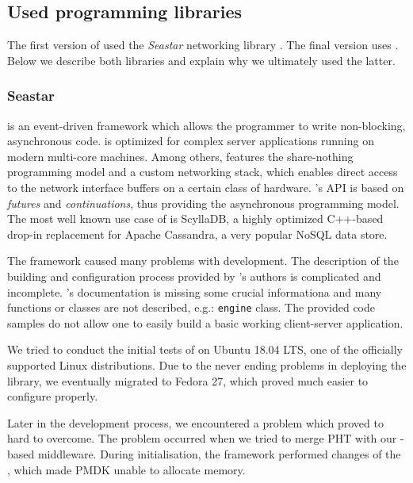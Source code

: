     \subsection{Used programming libraries}
        The first version of \DHTS used the \emph{Seastar} networking library \cite{Seastar}. The final version uses \Asio\cite{Asio}. Below we describe both libraries and explain why we ultimately used the latter.
    
        \subsubsection{Seastar}
            \Seastar is an event-driven framework which allows the programmer to write non-blocking, asynchronous code. \Seastar is optimized for complex server applications running on modern multi-core machines. Among others, \Seastar features the share-nothing programming model and a custom networking stack, which enables direct access to the network interface buffers on a certain class of hardware. \Seastar's API is based on \textit{futures} and \textit{continuations}, thus providing the asynchronous programming model. The most well known use case of \Seastar is ScyllaDB\cite{ScyllaDB}, a highly optimized C++-based drop-in replacement for Apache Cassandra\cite{Cassandra}, a very popular NoSQL data store.
            
            The \Seastar framework caused many problems with development. The description of the building and configuration process provided by \Seastar's authors is complicated and incomplete. \Seastar's  documentation is missing some crucial informationa and many functions or classes are not described, e.g.: \texttt{engine} class. The provided code samples do not allow one to easily build a basic working client-server application.
            
            We tried to conduct the initial tests of \Seastar on Ubuntu 18.04 LTS, one of the officially supported Linux distributions. Due to the never ending problems in deploying the library, we eventually migrated to Fedora 27, which proved much easier to configure properly. 
            
            Later in the development process, we encountered a problem which proved to hard to overcome. The problem occurred when we tried to merge PHT with our \Seastar-based middleware. During initialisation, the \Seastar framework performed changes of the  \cite{Hugepages}, which made PMDK unable to allocate memory.
            

